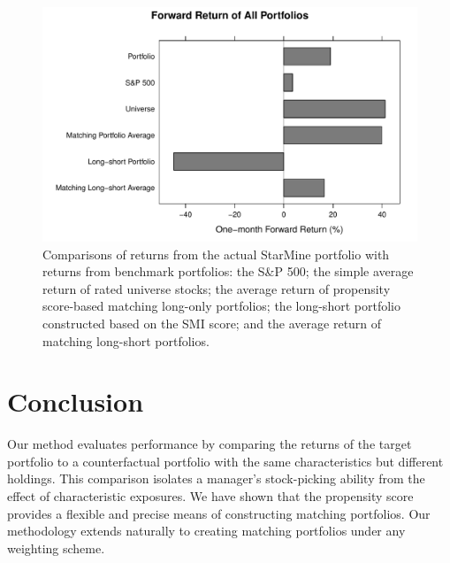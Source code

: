 \documentclass{article}\usepackage{graphicx, color}
\makeatletter
\def\maxwidth{ %
  \ifdim\Gin@nat@width>\linewidth
    \linewidth
  \else
    \Gin@nat@width
  \fi
}
\newenvironment{knitrout}{}{} %
\makeatother
\begin{document}
\begin{figure}
\begin{center}
\begin{knitrout}
\color{fgcolor}
\includegraphics[width=\maxwidth]{figure/unnamed-chunk-21} 

\end{knitrout}

\end{center}
\caption{Comparisons of returns from the actual StarMine portfolio
  with returns from benchmark portfolios: the S\&P 500; the simple
  average return of rated universe stocks; the average return of
  propensity score-based matching long-only portfolios; the
  long-short portfolio constructed based on the SMI score; and the
  average return of matching long-short portfolios.}
\label{FigureReturnComparison}
\end{figure}

\section{Conclusion}

Our method evaluates performance by comparing the returns of the target
portfolio to a counterfactual portfolio with the same characteristics
but different holdings. This comparison isolates a manager's
stock-picking ability from the effect of characteristic exposures.
We have shown that the propensity score provides a flexible and precise means of
constructing matching portfolios. Our methodology extends naturally to
creating matching portfolios under any weighting scheme.


\end{document}
